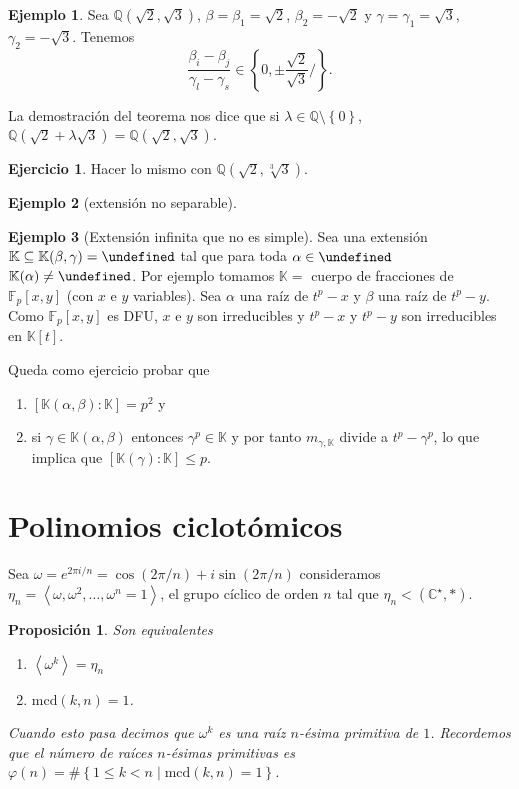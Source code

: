 \documentclass[10pt, spanish]{report}
\newtheorem{prop}[tma]{Proposición}
\theoremstyle{definition}
\newtheorem*{ej}{Ejemplo}
\theoremstyle{custom}
\newtheorem*{ejer}{Ejercicio}
\theoremstyle{remark}
\newcommand{\Q}{\mathbb{Q}}
\newcommand{\C}{\mathbb{C}}
\newcommand{\F}{\mathbb{F}}
\newcommand{\K}{\mathbb{K}}
\let\L\undefined
\newcommand{\L}{\mathbb{L}}
\newcommand{\mcd}[1]{\text{mcd}(#1)}
\renewcommand{\leq}{\leqslant}
\newcommand{\fecha}[1]{\marginpar{\underline{\footnotesize{#1}}}}
\newcommand{\completar}{\fxfatal{Completar}}
\begin{document}
\begin{ej}
    Sea $\Q(\sqrt{2},\sqrt{3})$, $\beta=\beta_1=\sqrt{2}$, $\beta_2=-\sqrt{2}$ y
    $\gamma=\gamma_1=\sqrt{3}$, $\gamma_2=-\sqrt{3}$. Tenemos
    \[\frac{\beta_i-\beta_j}{\gamma_l-\gamma_s}\in\left\{ 0,\pm\frac{\sqrt{2}
    }{\sqrt{3} }/ \right\}.\]

    La demostración del teorema nos dice que si $\lambda\in\Q\setminus\left\{0
    \right\}$, $\Q(\sqrt{2}+\lambda\sqrt{3})=\Q(\sqrt{2},\sqrt{3})$.
\end{ej}

\begin{ejer}
    Hacer lo mismo con $\Q(\sqrt{2},\sqrt[3]{3})$.
\end{ejer}


\begin{ej}[extensión no separable]
    \completar%
\end{ej}

\begin{ej}[Extensión infinita que no es simple]
    Sea una extensión $\K\subseteq\K(\beta,\gamma)=\L$ tal que para toda $\alpha
    \in\L$ $\K(\alpha)\neq \L$. Por ejemplo tomamos $\K = $ cuerpo de fracciones
    de $\F_p[x,y]$ (con $x$ e $y$ variables). Sea $\alpha$ una raíz de $t^p-x$ y
    $\beta$ una raíz de $t^p-y$. Como $\F_p[x,y]$ es DFU, $x$ e $y$ son
    irreducibles y $t^p-x$ y $t^p-y$ son irreducibles en $\K[t]$.

    Queda como ejercicio probar que
    \begin{enumerate}
        \item $\left[ \K(\alpha,\beta):\K \right] =p^2$ y
        \item si $\gamma\in\K(\alpha,\beta)$ entonces $\gamma^p \in\K$ y por
            tanto $m_{\gamma,\K}$ divide a $t^p-\gamma^p$, lo que implica que
            $[\K(\gamma):\K]\leq p$.  \end{enumerate}
\end{ej}

\fecha{6/04}
\section{Polinomios ciclotómicos}

Sea $\omega=e^{2\pi i / n}=\cos(2\pi /n)+ i \sin(2\pi /n)$ consideramos $\eta_n=
\left< \omega,\omega^2,\dots,\omega^n=1 \right> $, el grupo cíclico de orden $n$
tal que $\eta_n < (\C^\star, *)$.

\begin{prop}
    Son equivalentes
    \begin{enumerate}
        \item $\left< \omega^k \right> = \eta_n$ 
        \item $\mcd{k,n}=1$.
    \end{enumerate}
    Cuando esto pasa decimos que $\omega^k$ es una raíz $n$-ésima primitiva de
    $1$. Recordemos que el número de raíces $n$-ésimas primitivas es
    $\varphi(n)=\#\left\{ 1\leq k<n\mid \mcd{k,n}=1 \right\}$.  
\end{prop}
\end{document}
